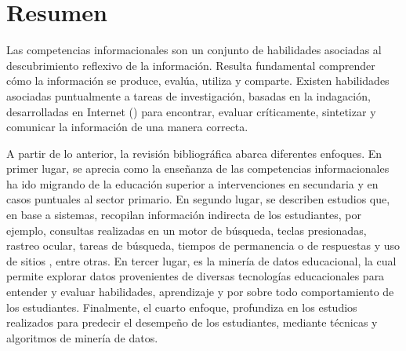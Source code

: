 \section{Resumen}
\label{sec:marco_estado_arte_resumen}
Las competencias informacionales son un conjunto de habilidades asociadas al descubrimiento  reflexivo de la información. Resulta fundamental comprender cómo la información se produce, evalúa, utiliza y comparte. Existen habilidades asociadas puntualmente a tareas de investigación, basadas en la indagación, desarrolladas en Internet () para encontrar, evaluar críticamente, sintetizar y comunicar la información de una manera correcta.  

A partir de lo anterior, la revisión bibliográfica abarca diferentes enfoques. En primer lugar, se aprecia como la enseñanza de las competencias informacionales ha ido migrando de la educación superior a intervenciones en secundaria y en casos puntuales al sector primario. En segundo lugar, se describen estudios que, en base a sistemas, recopilan información indirecta de los estudiantes, por ejemplo, consultas realizadas en un motor de búsqueda, teclas presionadas, rastreo ocular, tareas de búsqueda, tiempos de permanencia o de respuestas y uso de sitios , entre otras. En tercer lugar, es la minería de datos educacional, la cual permite explorar datos provenientes de diversas tecnologías educacionales para entender y evaluar habilidades, aprendizaje y por sobre todo comportamiento de los estudiantes. Finalmente, el cuarto enfoque, profundiza en los estudios realizados para predecir el desempeño de los estudiantes, mediante técnicas y algoritmos de minería de datos.   



